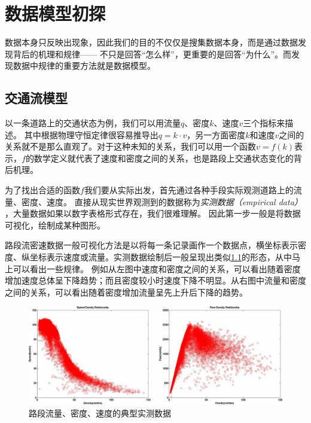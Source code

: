 \chapter{数据模型初探}

数据本身只反映出现象，因此我们的目的不仅仅是搜集数据本身，而是通过数据发现背后的机理和规律——
不只是回答“怎么样”，更重要的是回答“为什么”。而发现数据中规律的重要方法就是数据模型。

\section{交通流模型}

以一条道路上的交通状态为例，我们可以用流量$q$、密度$k$、速度$v$三个指标来描述。
其中根据物理守恒定律很容易推导出$q=k\cdot v$，另一方面密度$k$和速度$v$之间的关系就不是那么直观了。对于这种未知的关系，我们可以用一个函数$v=f(k)$表示，$f$的数学定义就代表了速度和密度之间的关系，也是路段上交通状态变化的背后机理。

为了找出合适的函数$f$我们要从实际出发，首先通过各种手段实际观测道路上的流量、密度、速度。
直接从现实世界观测到的数据称为\emph{实测数据（empirical data）}%
，大量数据如果以数字表格形式存在，我们很难理解。
因此第一步一般是将数据可视化，绘制成某种图形。

路段流密速数据一般可视化方法是以将每一条记录画作一个数据点，横坐标表示密度、纵坐标表示速度或流量。实测数据绘制后一般呈现出类似\cref{fig:empirical-qkv}的形态，从中马上可以看出一些规律。
例如从左图中速度和密度之间的关系，可以看出随着密度增加速度总体呈下降趋势；而且密度较小时速度下降不明显。从右图中流量和密度之间的关系，可以看出随着密度增加流量呈先上升后下降的趋势。

\begin{figure}
    \includegraphics[width=\linewidth]{images/empirical-qkv.jpg}
    \caption{路段流量、密度、速度的典型实测数据}
    \label{fig:empirical-qkv}
\end{figure}

